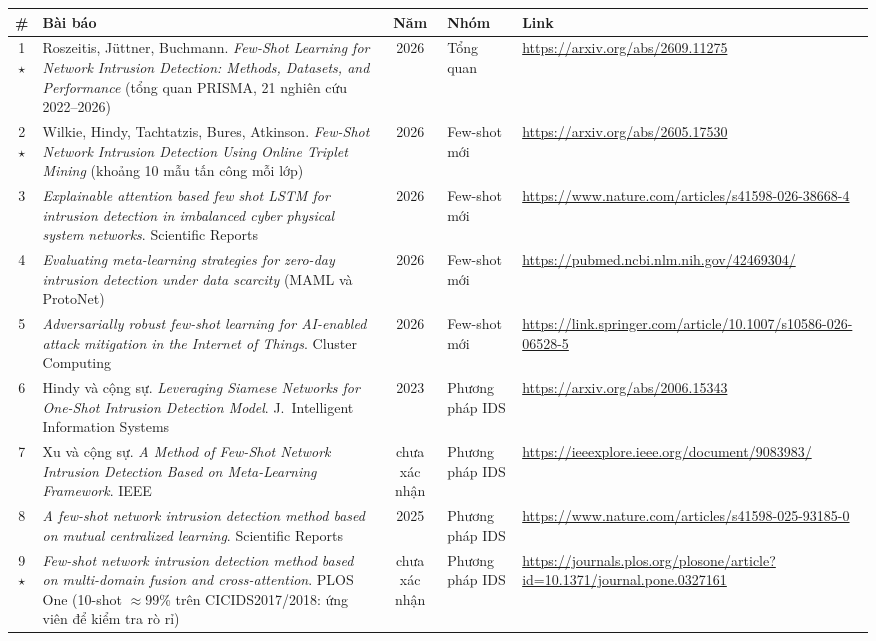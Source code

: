 \documentclass[10pt,a4paper,landscape]{article}
\begin{document}
\small
\noindent\begin{tabularx}{\textwidth}{@{}c X c l p{8.2cm}@{}}
\toprule
\textbf{\#} & \textbf{Bài báo} & \textbf{Năm} & \textbf{Nhóm} & \textbf{Link} \\
\midrule
1$\star$ & Roszeitis, Jüttner, Buchmann. \emph{Few-Shot Learning for Network Intrusion Detection: Methods, Datasets, and Performance} (tổng quan PRISMA, 21 nghiên cứu 2022--2026) & 2026 & Tổng quan & \url{https://arxiv.org/abs/2609.11275} \\
2$\star$ & Wilkie, Hindy, Tachtatzis, Bures, Atkinson. \emph{Few-Shot Network Intrusion Detection Using Online Triplet Mining} (khoảng 10 mẫu tấn công mỗi lớp) & 2026 & Few-shot mới & \url{https://arxiv.org/abs/2605.17530} \\
3 & \emph{Explainable attention based few shot LSTM for intrusion detection in imbalanced cyber physical system networks}. Scientific Reports & 2026 & Few-shot mới & \url{https://www.nature.com/articles/s41598-026-38668-4} \\
4 & \emph{Evaluating meta-learning strategies for zero-day intrusion detection under data scarcity} (MAML và ProtoNet) & 2026 & Few-shot mới & \url{https://pubmed.ncbi.nlm.nih.gov/42469304/} \\
5 & \emph{Adversarially robust few-shot learning for AI-enabled attack mitigation in the Internet of Things}. Cluster Computing & 2026 & Few-shot mới & \url{https://link.springer.com/article/10.1007/s10586-026-06528-5} \\
\midrule
6 & Hindy và cộng sự. \emph{Leveraging Siamese Networks for One-Shot Intrusion Detection Model}. J.\ Intelligent Information Systems & 2023 & Phương pháp IDS & \url{https://arxiv.org/abs/2006.15343} \\
7 & Xu và cộng sự. \emph{A Method of Few-Shot Network Intrusion Detection Based on Meta-Learning Framework}. IEEE & chưa xác nhận & Phương pháp IDS & \url{https://ieeexplore.ieee.org/document/9083983/} \\
8 & \emph{A few-shot network intrusion detection method based on mutual centralized learning}. Scientific Reports & 2025 & Phương pháp IDS & \url{https://www.nature.com/articles/s41598-025-93185-0} \\
9$\star$ & \emph{Few-shot network intrusion detection method based on multi-domain fusion and cross-attention}. PLOS One (10-shot $\approx$99\% trên CICIDS2017/2018: ứng viên để kiểm tra rò rỉ) & chưa xác nhận & Phương pháp IDS & \url{https://journals.plos.org/plosone/article?id=10.1371/journal.pone.0327161} \\

\end{tabularx}
\end{document}
